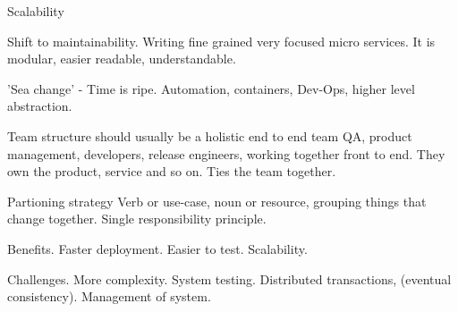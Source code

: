 Scalability 

Shift to maintainability. Writing fine grained very focused micro services. It is modular, easier readable, understandable.

'Sea change' - Time is ripe. Automation, containers, Dev-Ops, higher level abstraction.

Team structure should usually be a holistic end to end team QA, product management, developers, release engineers, working together front to end. They own the product, service and so on. Ties the team together.

Partioning strategy Verb or use-case, noun or resource, grouping things that change together. Single responsibility principle.

Benefits. Faster deployment. Easier to test. Scalability.

Challenges.
More complexity. System testing. Distributed transactions, (eventual consistency). Management of system.



